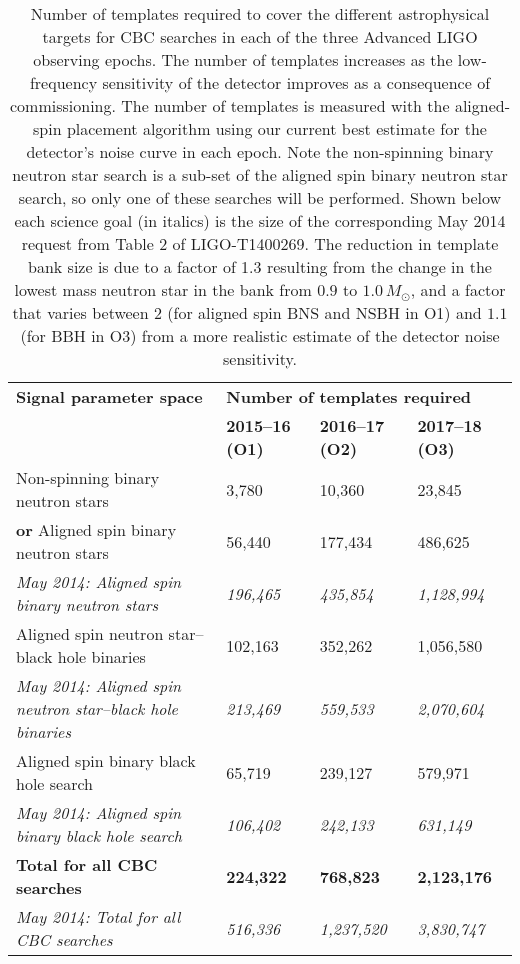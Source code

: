 \begin{table}[!t]
\centering
{\small
\begin{tabular}{|l|l|l|l|}
\hline 
{\bf Signal parameter space}  & \multicolumn{3}{l|}{\bf Number of templates required}\\

{ } &  {\bf 2015--16 (O1)} & {\bf 2016--17 (O2)} & {\bf 2017--18 (O3)}  \\\hline
{ Non-spinning binary neutron stars} & 3,780 & 10,360 & 23,845 \\\hline
{ \textbf{or} Aligned spin binary neutron stars} & 56,440 & 177,434 & 486,625 \\\hline
{ \it May 2014: Aligned spin binary neutron stars} &\it 196,465 &\it  435,854 &\it  1,128,994 \\\hline\hline
{ Aligned spin neutron star--black hole binaries} & 102,163 & 352,262 & 1,056,580 \\\hline
{ \it May 2014: Aligned spin neutron star--black hole binaries} &\it  213,469 &\it  559,533 &\it  2,070,604 \\\hline\hline
{ Aligned spin binary black hole search } & 65,719 & 239,127 & 579,971 \\\hline
{ \it May 2014: Aligned spin binary black hole search } &\it  106,402 &\it  242,133 &\it  631,149 \\\hline\hline
{ \bf Total for all CBC searches } & \bf 224,322 & \bf 768,823 & \bf 2,123,176 \\\hline
{ \it May 2014: Total for all CBC searches } & \it 516,336  &\it 1,237,520  &\it 3,830,747  \\\hline

\end{tabular}
}
\caption{\label{t:bank-size} Number of templates required to cover the
different astrophysical targets for CBC searches in each of the three Advanced
LIGO observing epochs. The number of templates increases as the low-frequency
sensitivity of the detector improves as a consequence of commissioning. The
number of templates is measured with the aligned-spin placement
algorithm using our current best estimate for the detector's noise curve in
each epoch.
Note the non-spinning binary neutron star search is a sub-set of the
aligned spin binary neutron star search, so only one of these searches will be
performed. Shown below each science goal (in italics) is the size of the
corresponding May 2014 request from Table 2 of LIGO-T1400269. The reduction in
template bank size is due to a factor of 1.3 resulting from the change in the
lowest mass neutron star in the bank from $0.9$ to $1.0\, M_\odot$, and a
factor that varies between $2$ (for aligned spin BNS and NSBH in O1) and $1.1$ (for BBH in O3) from a
more realistic estimate of the detector noise sensitivity. 
}
\end{table}

